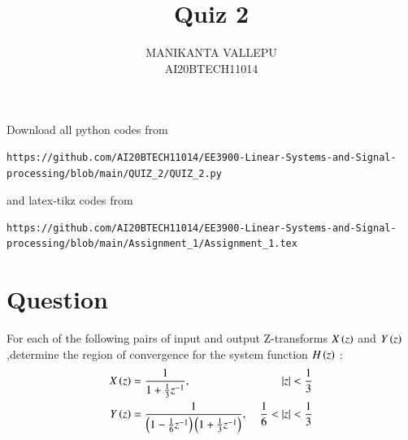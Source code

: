 \documentclass[journal,12pt,twocolumn]{IEEEtran}
\begin{document}
\makeatletter
{}
\makeatother
\let\StandardTheFigure\thefigure
\let\vec\mathbf
\renewcommand{\thefigure}{\theproblem}
\def\putbox#1#2#3{\makebox[0in][l]{\makebox[#1][l]{}\raisebox{\baselineskip}[0in][0in]{\raisebox{#2}[0in][0in]{#3}}}}
     \def\rightbox#1{\makebox[0in][r]{#1}}
     \def\centbox#1{\makebox[0in]{#1}}
     \def\topbox#1{\raisebox{-\baselineskip}[0in][0in]{#1}}
     \def\midbox#1{\raisebox{-0.5\baselineskip}[0in][0in]{#1}}
\vspace{3cm}
\title{Quiz 2}
\author{MANIKANTA VALLEPU \\ AI20BTECH11014}
\maketitle
\newpage
\bigskip
\renewcommand{\thefigure}{\theenumi}
\renewcommand{\thetable}{\theenumi}
Download all python codes from 
\begin{lstlisting}
https://github.com/AI20BTECH11014/EE3900-Linear-Systems-and-Signal-processing/blob/main/QUIZ_2/QUIZ_2.py
\end{lstlisting}
%
and latex-tikz codes from 
%
\begin{lstlisting}
https://github.com/AI20BTECH11014/EE3900-Linear-Systems-and-Signal-processing/blob/main/Assignment_1/Assignment_1.tex
\end{lstlisting}
%
\section{Question}
For each of the following pairs of input and output Z-transforms $X\left(z\right)$ and $Y\left(z\right)$,determine the region of convergence for the system function $H\left(z\right)$ : 
\begin{align}
    X\left(z\right) &= \dfrac{1}{1+ \frac{1}{3}z^{-1}} ,\ &\vert z\vert < \frac{1}{3} \label{a}\\
    Y\left(z\right) &= \dfrac{1}{\left(1- \frac{1}{6}z^{-1}\right)\left(1+ \frac{1}{3}z^{-1}\right)}, \ &\frac{1}{6} < \vert z\vert < \frac{1}{3} \label{b}
\end{align}
\end{document}
